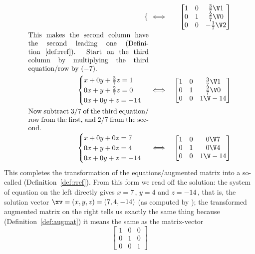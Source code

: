 \begin{example}
\begin{solution}
\begin{eqnarray*}
\begin{cases}
\end{cases}
&\iff&%
\begin{bmatrix} 1&0&\frac37\V1\\0&1&\frac27\V0\\0&0&-\frac17\V2 \end{bmatrix}
\\[0ex plus 1ex]
\parbox{0.5\linewidth}{This makes the second column have the second leading one (Definition~\ref{def:rref}).  
Start on the third column by multiplying the third equation\slash row by~\((-7)\).}
\\[0ex plus 1ex]
\begin{cases}
x+0y+\frac37z=1\\ 0x+y+\frac27z=0\\ 0x+0y+z=-14
\end{cases}
&\iff&%
\begin{bmatrix} 1&0&\frac37\V1\\0&1&\frac27\V0\\0&0&1\V-14 \end{bmatrix}
\\[0ex plus 1ex]
\parbox{0.5\linewidth}{Now subtract \(3/7\)~of the third equation\slash row from the first, and \(2/7\) from the second.}
\\[0ex plus 1ex]
\begin{cases}
x+0y+0z=7\\ 0x+y+0z=4\\ 0x+0y+z=-14
\end{cases}
&\iff&%
\begin{bmatrix} 1&0&0\V7\\0&1&0\V4\\0&0&1\V-14 \end{bmatrix}
\end{eqnarray*}
This completes the transformation of the equations\slash augmented matrix into a so-called  (Definition~\ref{def:rref}).
From this form we read off the solution:  the system of equation on the left directly gives \(x=7\)\,, \(y=4\) and \(z=-14\)\,, that is, the solution vector \(\xv=(x,y,z)=(7,4,-14)\) (as computed by \script);
the transformed augmented matrix on the right tells us exactly the same thing because (Definition~\ref{def:augmat}) it means the same as the matrix-vector 
\begin{equation*}
\begin{bmatrix} 1&0&0\\0&1&0\\0&0&1 \end{bmatrix}

\end{equation*}
\end{solution}
\end{example}
